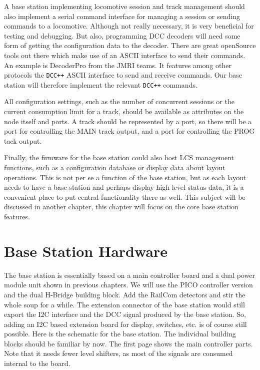 A base station implementing locomotive session and track management should also implement a serial command interface for managing a session or sending commands to a locomotive. Although not really necessary, it is very beneficial for testing and debugging. But also, programming DCC decoders will need some form of getting the configuration data to the decoder. There are great openSource tools out there which make use of an ASCII interface to send their commands. An example is DecoderPro from the JMRI teams. It features among other protocols the \texttt{DCC++} ASCII interface to send and receive commands. Our base station will therefore implement the relevant \texttt{DCC++} commands.

All configuration settings, such as the number of concurrent sessions or the current consumption limit for a track, should be available as attributes on the node itself and ports. A track should be represented by a port, so there will be a port for controlling the MAIN track output, and a port for controlling the PROG tack output.

Finally, the firmware for the base station could also host LCS management functions, such as a configuration database or display data about layout operations. This is not per se a function of the base station, but as each layout needs to have a base station and perhaps display high level status data, it is a convenient place to put central functionality there as well. This subject will be discussed in another chapter, this chapter will focus on the core base station features.

\section{Base Station Hardware}

The base station is essentially based on a main controller board and a dual power module unit shown in previous chapters. We will use the PICO controller version and the dual H-Bridge building block. Add the RailCom detectors and stir the whole soup for a while. The extension connector of the base station would still export the I2C interface and the DCC signal produced by the base station. So, adding an I2C based extension board for display, switches, etc. is of course still possible. Here is the schematic for the base station. The individual building blocks should be familiar by now. The first page shows the main controller parts. Note that it needs fewer level shifters, as most of the signals are consumed internal to the board.


